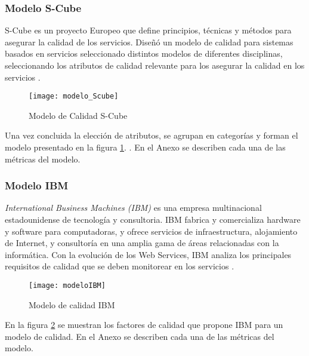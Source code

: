 \subsubsection{Modelo S-Cube}
\label{MarcoConceptual:modelo_SCube}
S-Cube es un proyecto Europeo que define  principios, técnicas y métodos  para asegurar la calidad de los servicios. Diseñó un modelo de calidad para sistemas basados en servicios seleccionado distintos modelos de diferentes disciplinas, seleccionando los atributos de calidad relevante para los asegurar la calidad en los servicios \cite{Scube}.
  \begin{figure}[h]
    \centering
    \texttt{[image: modelo\_Scube]}
    \caption{Modelo de Calidad S-Cube}
    \label{figura:modelo_Scube}
  \end{figure}
Una vez concluida la elección de atributos, se agrupan en categorías y forman el modelo presentado en la figura \ref{figura:modelo_Scube}. 
\cite{Articulo:LauraGonzalez:CalidadWS}.
En el Anexo se describen cada una de las métricas del modelo.
\subsubsection{Modelo IBM}
\label{MarcoConceptual:modelo_IBM}
\emph{International Business Machines (IBM)} es una empresa multinacional estadounidense de tecnología y consultoria. IBM fabrica y comercializa hardware y software para computadoras, y ofrece servicios de infraestructura, alojamiento de Internet, y consultoría en una amplia gama de áreas relacionadas con la informática. Con la evolución de los Web Services, IBM analiza los principales requisitos de calidad que se deben monitorear en los servicios \cite{IBM:QoS}.
  \begin{figure}[h]
    \centering
    \texttt{[image: modeloIBM]}
    \caption{Modelo de calidad IBM}
    \label{figura:modelo_IBM}
  \end{figure}
En la figura \ref{figura:modelo_IBM} se muestran los factores de calidad que propone IBM para un modelo de calidad. En el Anexo se describen cada una de las métricas del modelo.
